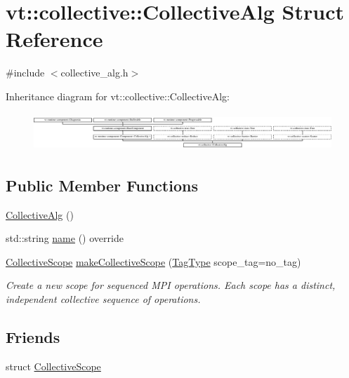 \hypertarget{structvt_1_1collective_1_1_collective_alg}{}\section{vt\+:\+:collective\+:\+:Collective\+Alg Struct Reference}
\label{structvt_1_1collective_1_1_collective_alg}


{\ttfamily \#include $<$collective\+\_\+alg.\+h$>$}

Inheritance diagram for vt\+:\+:collective\+:\+:Collective\+Alg\+:\begin{figure}[H]
\begin{center}
\leavevmode
\includegraphics[height=1.435897cm]{structvt_1_1collective_1_1_collective_alg}
\end{center}
\end{figure}
\subsection*{Public Member Functions}
\begin{DoxyCompactItemize}
\item 
\hyperlink{structvt_1_1collective_1_1_collective_alg_aa137479fb6afcfa33e73592ea3cbbcd8}{Collective\+Alg} ()
\item 
std\+::string \hyperlink{structvt_1_1collective_1_1_collective_alg_a81788afa34bc094c9f71fef8681aefb3}{name} () override
\item 
\hyperlink{structvt_1_1collective_1_1_collective_scope}{Collective\+Scope} \hyperlink{structvt_1_1collective_1_1_collective_alg_a6f2b4c832a5cc11cb7dfc238ecd48edf}{make\+Collective\+Scope} (\hyperlink{namespacevt_a84ab281dae04a52a4b243d6bf62d0e52}{Tag\+Type} scope\+\_\+tag=no\+\_\+tag)
\begin{DoxyCompactList}\small\item\em Create a new scope for sequenced M\+PI operations. Each scope has a distinct, independent collective sequence of operations. \end{DoxyCompactList}\end{DoxyCompactItemize}
\subsection*{Friends}
\begin{DoxyCompactItemize}
\item 
struct \hyperlink{structvt_1_1collective_1_1_collective_alg_a915db0886f5b77be011e5a55413319f5}{Collective\+Scope}
\end{DoxyCompactItemize}
